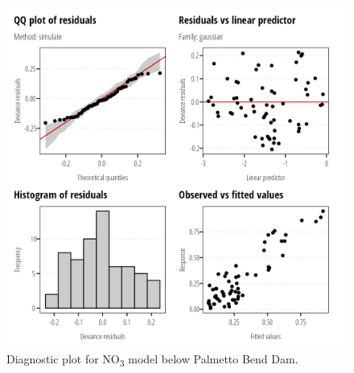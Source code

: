 \documentclass[
]{article}
\begin{document}
\clearpage

\begin{figure}[h]

{\centering \includegraphics{model_assessment_files/figure-pdf/unnamed-chunk-64-1.png}

}

\caption{Diagnostic plot for NO\textsubscript{3} model below Palmetto
Bend Dam.}

\end{figure}
\end{document}
